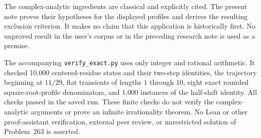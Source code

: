 \documentclass[11pt,a4paper]{article}
\theoremstyle{remark}\newtheorem{remark}[theorem]{Remark}
\begin{document}
The complex-analytic ingredients are classical and explicitly cited.
The present note proves their hypotheses for the displayed profiles and
derives the resulting exclusion criterion. It makes no claim that this
application is historically first. No unproved result in the user's corpus
or in the preceding research note is used as a premise.

The accompanying \texttt{verify\_exact.py} uses only integer and rational
arithmetic. It checked 10,000 centered-residue states and their two-step
identities, the trajectory beginning at $11/29$, flat transients of lengths
$1$ through $10$, eight exact rounded square-root-profile denominators, and
1,000 instances of the half-shift identity. All checks passed in the saved
run. These finite checks do not verify the complex-analytic arguments or
prove an infinite irrationality theorem. No Lean or other proof-assistant
verification, external peer review, or unrestricted solution of Problem~263
is asserted.
\end{document}
